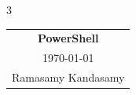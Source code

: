 



\raggedright
\footnotesize
\raggedcolumns
\begin{multicols*}{3}
\setlength{\premulticols}{1pt}
\setlength{\postmulticols}{1pt}
\setlength{\multicolsep}{1pt}
\setlength{\columnsep}{2pt}


\begin{center}
\begin{tabular}{c}
\Large{\textbf{PowerShell}}\\
\today\\
Ramasamy Kandasamy\\
\end{tabular}
\end{center}












\end{multicols*}




